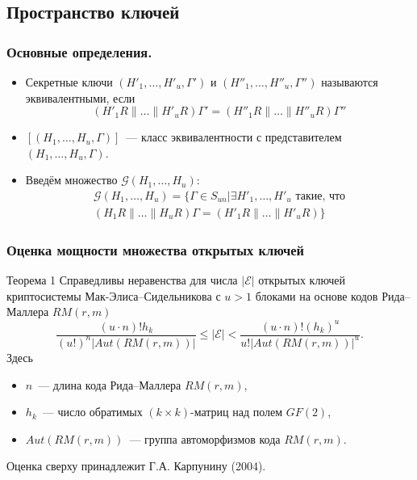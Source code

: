 \subsection{Пространство ключей}

\begin{frame}
  \frametitle{Основные определения.}
  \begin{itemize}
    \item
        Секретные ключи $(H'_1,\dots,H'_u,\Gamma')$ и $(H''_1,\ldots,H''_u,\Gamma'')$
        называются \alert{эквивалентными}, если
        $$
        (H'_1R\|\ldots\|H'_uR)\Gamma'=(H''_1R\|\ldots\|H''_uR)\Gamma''
        $$
    \item
        $[(H_1,\ldots,H_u,\Gamma)]$~--- класс эквивалентности с
        представителем $(H_1,\ldots,H_u,\Gamma)$.
        \pause
    \item
        Введём множество $\mathcal G(H_1,\ldots,H_u)$:
        \begin{eqnarray*}
            \mathcal G(H_1,\ldots,H_u)=\{\Gamma\in S_{un}|
            \exists H'_1,\ldots, H'_u\text{ такие, что}\\
            (H_1R\|\ldots\|H_uR)\Gamma=(H'_1R\|\ldots\|H'_uR)\}
        \end{eqnarray*}
  \end{itemize}

\end{frame}

\begin{frame}
  \frametitle{Оценка мощности множества открытых ключей}
\begin{block}{Теорема 1}
Справедливы неравенства для числа $|\mathcal E|$ открытых ключей криптосистемы
Мак-Элиса--Сидельникова с $u>1$ блоками на основе кодов Рида--Маллера $RM(r,m)$
$$
\frac{(u\cdot n)!h_k}{(u!)^n|Aut(RM(r,m))|}\leqslant |\mathcal E|<\frac{(u\cdot
n)!(h_k)^u}{u!|Aut(RM(r,m))|^u}.
$$
Здесь
\begin{itemize}
\item $n$~--- длина кода Рида--Маллера $RM(r,m)$,
\item $h_k$~--- число обратимых $(k\times k)$-матриц над полем $GF(2)$,
\item $Aut(RM(r,m))$~--- группа автоморфизмов кода $RM(r,m)$.
\end{itemize}
\end{block}
Оценка сверху принадлежит Г.А. Карпунину (2004).
\end{frame}
